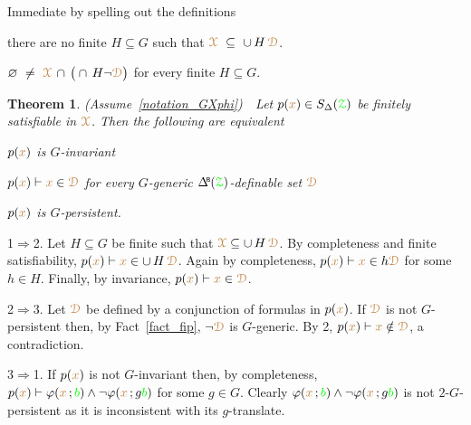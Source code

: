 \documentclass[10pt,openany]{amsproc}
\makeatletter
\newcommand{\mylabel}[1]{{\ssf{#1}}\hfill}
\renewenvironment{itemize}
  {\begin{list}{}{%
   \setlength{\parskip}{0mm}
   \setlength{\topsep}{.2\baselineskip}
   \setlength{\rightmargin}{0mm}
   \setlength{\listparindent}{0mm}
   \setlength{\itemindent}{0mm}
   \setlength{\labelwidth}{2ex}
   \setlength{\itemsep}{.1\baselineskip}
   \setlength{\parsep}{0mm}
   \setlength{\partopsep}{0mm}
   \setlength{\labelsep}{1ex}
   \setlength{\leftmargin}{\labelwidth+\labelsep}
   \let\makelabel\mylabel
   }}
   {\vspace*{-.3\baselineskip}\end{list}}
\def\proves{\vdash}
\def\BDelta{\smash{\Delta\hskip-.4ex\raisebox{.8ex}{\tiny\sf B}}}
\def\IMP{\Rightarrow}
\def\D{\EuScript D}
\def\X{\EuScript X}
\def\Z{\EuScript Z}
\def\0{\varnothing}
\def\theta{\vartheta}
\def\phi{\varphi}
\def\ssf#1{\textsf{\small #1}}
\newcounter{thm}
\theoremstyle{mio}
\newtheorem{theorem}[thm]{Theorem}\tcolorboxenvironment{theorem}{mythm}
\providecommand{\proofNameStyle}{\bfseries}
\renewenvironment{proof}[1][\proofname]{\par
  \pushQED{\qed}%
  \normalfont%
  \trivlist
  \item[\hskip\labelsep
        \proofNameStyle
    #1\@addpunct{.}]\ignorespaces
}{%
  \popQED\endtrivlist\@endpefalse
}
\def\mr{\color{brown}}
\def\gr{\color{green}}
\def\mrD{{\mr\D}}
\def\mrX{{\mr\X}}
\def\grZ{{\gr\Z}}
\makeatother
\begin{document}
\begin{proof}
  Immediate by spelling out the definitions
  \begin{itemize}
    \item[1.] there are no finite $H\subseteq G$ such that $\mrX\ \subseteq\ \cup\, H\,{\mr\D}$.
    \item[2.]  $\0\ \neq\ \mrX\,\cap\,\big(\cap\, H\neg{\mr\D}\big)$ for every finite $H\subseteq G$.\qedhere
  \end{itemize} 
\end{proof}

\begin{theorem}\label{thm_generic_invariant}
  (Assume~\ref{notation_GXphi})\ \  
  Let $p({\mr x})\in S_\Delta(\grZ)$ be finitely satisfiable in $\mrX$.
  Then the following are equivalent
  \begin{itemize}
    \item[1.] $p({\mr x})$ is $G$-invariant
    \item[2.] $p({\mr x})\proves{\mr x}\in\mrD$ for every $G$-generic $\BDelta({\grZ})$-definable set $\mrD$
    \item[3.] $p({\mr x})$ is $G$-persistent.
  \end{itemize}
\end{theorem}

\begin{proof}
  \ssf1$\IMP$\ssf2.
  Let $H\subseteq G$ be finite such that $\mrX\subseteq\cup\,H\,\mrD$.
  By completeness and finite satisfiability, $p({\mr x})\proves {\mr x}\in\cup\,H\,\mrD$.
  Again by completeness, $p({\mr x})\proves {\mr x}\in h\mrD$ for some $h\in H$.
  Finally, by invariance,  $p({\mr x})\proves{\mr x}\in\mrD$.
  
  \ssf2$\IMP$\ssf3.
  Let $\mrD$ be defined by a conjunction of formulas in $p({\mr x})$.
  If $\mrD$ is not $G$-persistent then, by Fact~\ref{fact_fip}, $\neg\mrD$ is $G$-generic. 
  By \ssf2, $p({\mr x})\proves{\mr x}\notin\mrD$, a contradiction.

  \ssf3$\IMP$\ssf1.
  If $p({\mr x})$ is not $G$-invariant then, by completeness, $p({\mr x})\proves\phi({\mr x}\,;{\gr b})\wedge\neg\phi({\mr x}\,;g{\gr b})$ for some $g\in G$.
  Clearly $\phi({\mr x}\,;{\gr b})\wedge\neg\phi({\mr x}\,;g{\gr b})$ is not $2$-$G$-persistent as it is inconsistent with its $g$-translate.
\end{proof}
\end{document}
